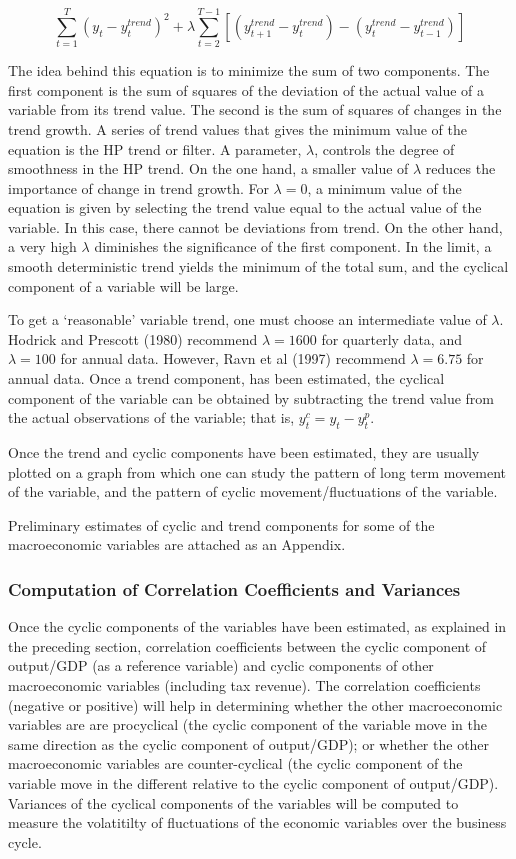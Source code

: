 \documentclass[12pt,a4paper,final]{article}
\begin{document}
\[ \sum_{t=1}^T\left( y_t - y_t^{trend}\right) ^2 + \lambda \sum_{t=2}^{T-1} \left[ \left( y_{t+1}^{trend} - y_t^{trend}\right) -\left( y_t^{trend} - y_{t-1}^{trend}\right)  \right] \]

The idea behind this equation is to minimize the sum of two components.  The first component is the sum of squares of the deviation of the actual value of a variable from its trend value.  The second is the sum of squares of changes in the trend growth.  A series of trend values that gives the minimum value of the equation is the HP trend or filter.
A parameter, $\lambda$, controls the degree of smoothness in the HP trend.  On the one hand, a smaller value of $\lambda$ reduces the importance of change in trend growth.  For $\lambda = 0$, a minimum value of the equation is given by selecting the trend value equal to the actual value of the variable.  In this case, there cannot be deviations from trend.  On the other hand, a very high $\lambda$ diminishes the significance of the first component.  In the limit, a smooth deterministic trend yields the minimum of the total sum, and the cyclical component of a variable will be large. 

To get a `reasonable' variable trend, one must choose an intermediate value of $\lambda$.  Hodrick and Prescott (1980) recommend $\lambda = 1600$ for quarterly data, and $\lambda = 100$ for annual data.  However, Ravn et al (1997) recommend $\lambda = 6.75$ for annual data. Once a trend component, has been estimated, the cyclical component of the variable can be obtained by subtracting the trend value from the actual observations of the variable; that is, $y_t^c = y_t - y_t^p$. 

Once the trend and cyclic components have been estimated, they are usually plotted on a graph from which one can study the pattern of long term movement of the variable, and the pattern of cyclic movement/fluctuations of the variable.

Preliminary estimates of cyclic and trend components for some of the macroeconomic variables are attached as an Appendix.

\subsubsection{Computation of Correlation Coefficients and Variances}

Once the cyclic components of the variables have been estimated, as explained in the preceding section, correlation coefficients between the cyclic component of output/GDP (as a reference variable) and cyclic components of other macroeconomic variables (including tax revenue).  The correlation coefficients (negative or positive) will help in determining whether the other macroeconomic variables are are procyclical (the cyclic component of the variable move in the same direction as the cyclic component of output/GDP); or whether the other macroeconomic variables are counter-cyclical (the cyclic component of the variable move in the different relative to the cyclic component of output/GDP). Variances of the cyclical components of the variables will be computed to measure the volatitilty of fluctuations of the economic variables over the business cycle.
\end{document}
